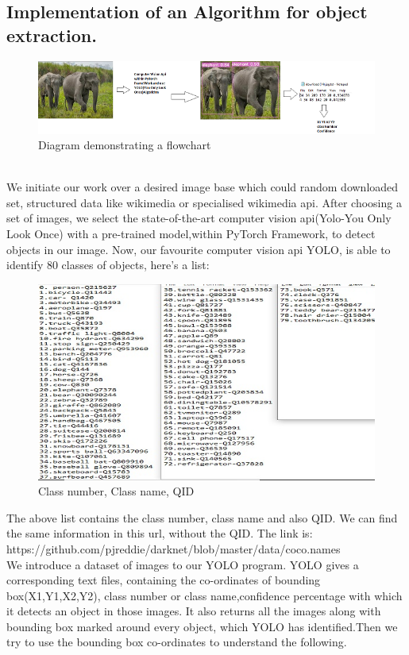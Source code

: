 \documentclass[12pt]{article}
\begin{document}
\subsection{Implementation of an Algorithm for object extraction.}

\begin{figure}[!h]
\includegraphics{pirated.png}
\caption{Diagram demonstrating a flowchart}
\end{figure}\\We initiate our work over a desired image base which could random downloaded set, structured data like wikimedia or specialised wikimedia api. After choosing a set of images, we select the state-of-the-art computer vision api(Yolo-You Only Look Once) with a pre-trained model,within PyTorch Framework, to detect objects in our image. Now, our favourite computer vision api YOLO, is able to identify 80 classes of objects, here's a list: 
\begin{figure}[!h]
\includegraphics{classnameNumberQIDp.jpg}
\caption{Class number, Class name, QID}
\end{figure}
\newpage
The above list contains the class number, class name and also QID. We can find the same information in this url, without the QID. The link is:\\ https://github.com/pjreddie/darknet/blob/master/data/coco.names\cite{class}\\We introduce a dataset of images to our YOLO program. YOLO gives a corresponding text files, containing the co-ordinates of bounding box(X1,Y1,X2,Y2), class number or class name,confidence percentage with which it detects an object in those images. It also returns all the images along with bounding box marked around every object, which YOLO has identified.Then we try to use the bounding box co-ordinates to understand the following. 
\end{document}
